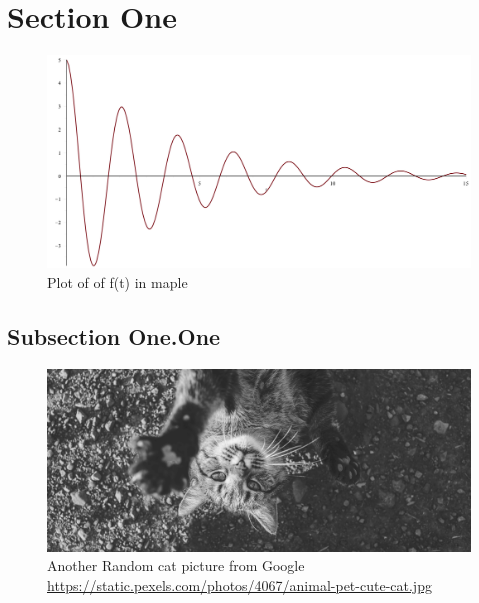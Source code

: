 
\section{Section One}
\lipsum[1-2]

\begin{figure}[h]
  \centering
  \includegraphics[width=\linewidth]{../img/plot}
  \caption{Plot of of f(t) in maple}
  \label{img:function}
\end{figure}

\lipsum[3-4]

\subsection{Subsection One.One}
\lipsum[5]

\begin{figure}[ht]
  \centering
  \includegraphics[width=\linewidth]{../img/example2}
  \caption{Another Random cat picture from Google \protect\url{https://static.pexels.com/photos/4067/animal-pet-cute-cat.jpg}}
  \label{img:cat2}
\end{figure}

